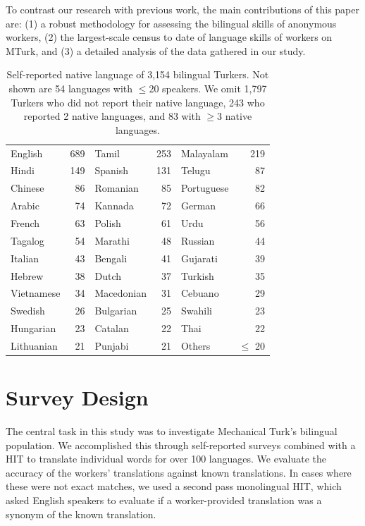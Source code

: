 \documentclass[11pt]{article}
\begin{document}
To contrast our research with previous work, the main contributions of this paper are: (1) a robust methodology for assessing the bilingual  skills of anonymous workers, (2) the largest-scale census to date of language skills of workers on MTurk, and (3) a detailed analysis of the data gathered in our study.

\begin{table}
\footnotesize
\begin{tabular}{lrlrlr}\hline\hline
\hline
English & 689 & Tamil & 253 & Malayalam & 219 \\
Hindi & 149 & Spanish & 131 & Telugu & 87 \\
Chinese & 86 & Romanian & 85 & Portuguese & 82 \\
Arabic & 74 & Kannada & 72 & German & 66 \\
French & 63 & Polish & 61 & Urdu & 56 \\
Tagalog & 54 & Marathi & 48 & Russian & 44 \\
Italian & 43 & Bengali & 41 & Gujarati & 39 \\
Hebrew & 38 & Dutch & 37 & Turkish & 35 \\
Vietnamese & 34 & Macedonian & 31 & Cebuano & 29 \\
Swedish & 26 & Bulgarian & 25 & Swahili & 23 \\
Hungarian & 23 & Catalan & 22 & Thai & 22 \\
Lithuanian & 21 & Punjabi & 21 & Others & $\leq$ 20 \\
\hline\hline
\end{tabular}
\normalsize
\caption{Self-reported native language of 3,154 bilingual Turkers. Not shown are 54 languages with $\leq$20 speakers. 
We omit 1,797 Turkers who did not report their native language, 243 who reported 2 native languages, and 83 with $\geq$3 native languages.}\label{lang-pie}
\end{table}

\section{Survey Design}
The central task in this study was to investigate Mechanical Turk's bilingual population.  We accomplished this through self-reported surveys combined with a HIT to translate individual words for over 100 languages.  We evaluate the accuracy of the workers' translations against known translations.  In cases where these were not exact matches, we used a second pass monolingual HIT, which asked English speakers to evaluate if a worker-provided translation was a synonym of the known translation.
\end{document}
